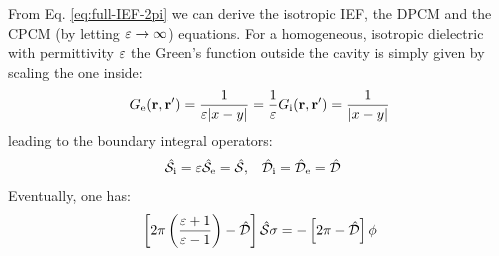 From Eq. \eqref{eq:full-IEF-2pi} we can derive the isotropic
\acs{IEF}, the \acs{DPCM} and the \acs{CPCM} (by letting
$\varepsilon\rightarrow\infty$) equations.
For a homogeneous, isotropic dielectric with permittivity $\varepsilon$ the
Green's function outside the cavity is simply given by scaling the one
inside:
\begin{equation}
  G_\mathrm{e}(\mathbf{r}, \mathbf{r}^\prime) = \frac{1}{\varepsilon|x-y|} = \frac{1}{\varepsilon} G_\mathrm{i}(\mathbf{r}, \mathbf{r}^\prime) = \frac{1}{|x-y|}
\end{equation}
leading to the boundary integral operators:
\begin{alignat}{2}
  \hat{\mathcal{S}}_\mathrm{i} = \varepsilon\hat{\mathcal{S}}_\mathrm{e} = \hat{\mathcal{S}}, \quad&
  \hat{\mathcal{D}}_\mathrm{i} = \hat{\mathcal{D}}_\mathrm{e} = \hat{\mathcal{D}}
\end{alignat}
Eventually, one has:
\begin{equation}\label{eq:isotropic-IEF}
  \left[ 2\pi \left(\frac{\varepsilon+1}{\varepsilon-1}\right)
  - \hat{\mathcal{D}} \right]\hat{\mathcal{S}}\sigma
  =
  -\left[2\pi-\hat{\mathcal{D}}\right]\phi
\end{equation}
